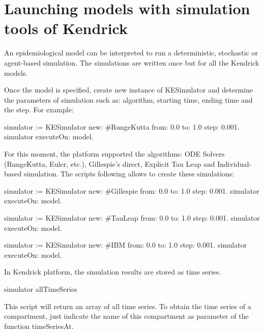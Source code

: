 \documentclass[a4paper,10pt,twoside]{book}
\begin{document}
\section{Launching models with simulation tools of Kendrick}
An epidemiological model can be interpreted to run a deterministic, stochastic or agent-based simulation.
The simulations are written once but for all the Kendrick models.

Once the model is specified, create new instance of KESimulator and determine the parameters of simulation such as: algorithm, starting time, ending time and the step.
For example:

\begin{code}{}
simulator := KESimulator new: #RungeKutta from: 0.0 to: 1.0 step: 0.001.
simulator executeOn: model.
\end{code}

For this moment, the platform supported the algorithms: ODE Solvers (RungeKutta, Euler, etc.), Gillespie's direct, Explicit Tau Leap and Individual-based simulation.
The scripts following allows to create these simulations:

\begin{code}{}
simulator := KESimulator new: #Gillespie from: 0.0 to: 1.0 step: 0.001.
simulator executeOn: model.
\end{code}



\begin{code}{}
simulator := KESimulator new: #TauLeap from: 0.0 to: 1.0 step: 0.001.
simulator executeOn: model.
\end{code}



\begin{code}{}
simulator := KESimulator new: #IBM from: 0.0 to: 1.0 step: 0.001.
simulator executeOn: model.
\end{code}


In Kendrick platform, the simulation results are stored as time series.

\begin{code}{}
simulator allTimeSeries
\end{code}

This script will return an array of all time series.
To obtain the time series of a compartment, just indicate the name of this compartment as parameter of the function timeSeriesAt.
\end{document}

